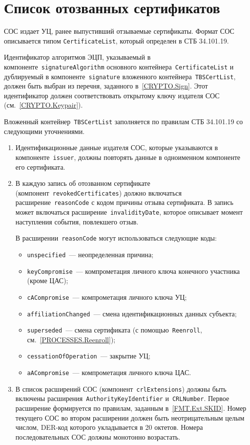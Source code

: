 \section{Список отозванных сертификатов}\label{FMT.CRL}

СОС издает УЦ, ранее выпустивший отзываемые сертификаты.
Формат СОС описывается типом \texttt{CertificateList}, который определен в 
СТБ 34.101.19. 

Идентификатор алгоритмов ЭЦП, указываемый в
компоненте~\texttt{signatureAlgorithm} основного
контейнера~\texttt{CertificateList} и дублируемый в
компоненте~\texttt{signature} вложенного контейнера~\texttt{TBSCertList},
должен быть выбран из перечня, заданного в~\ref{CRYPTO.Sign}. Этот
идентификатор должен соответствовать открытому ключу издателя СОС
(см.~\ref{CRYPTO.Keypair}).

Вложенный контейнер~\texttt{TBSCertList} заполняется по правилам СТБ 
34.101.19 со следующими уточнениями.

\begin{enumerate}
\item
Идентификационные данные издателя СОС, которые указываются в 
компоненте~\texttt{issuer}, должны повторять данные в одноименном 
компоненте его сертификата. 

\item
В каждую запись об отозванном сертификате 
(компонент~\texttt{revokedCertificates}) должно включаться 
расширение~\texttt{reasonCode} с кодом причины отзыва сертификата. 
%
В запись может включаться расширение~\texttt{invalidityDate}, которое 
описывает момент наступления события, повлекшего отзыв.

В расширении~\texttt{reasonCode} могут использоваться следующие коды:
\begin{itemize}
\item
\texttt{unspecified}~--- неопределенная причина;
\item
\texttt{keyCompromise}~--- компрометация личного ключа конечного участника 
(кроме ЦАС); 
\item
\texttt{cACompromise}~--- компрометация личного ключа УЦ;
\item
\texttt{affiliationChanged}~--- смена идентификационных данных субъекта;
\item
\texttt{superseded}~--- смена сертификата (с помощью~\texttt{Reenroll}, 
см.~\ref{PROCESSES.Reenroll}); 
\item
\texttt{cessationOfOperation}~--- закрытие УЦ;
\item
\texttt{aACompromise}~--- компрометация личного ключа ЦАС.
\end{itemize}

\item
В список расширений СОС (компонент~\texttt{crlExtensions})
должны быть включены расширения~\texttt{AuthorityKeyIdentifier} 
и~\texttt{CRLNumber}. Первое расширение формируется по правилам,
заданным в~\ref{FMT.Ext.SKID}. Номер текущего СОС во втором расширении
должен быть неотрицательным целым числом, DER-код которого укладывается в 
20 октетов. Номера последовательных СОС должны монотонно возрастать.
\end{enumerate}
